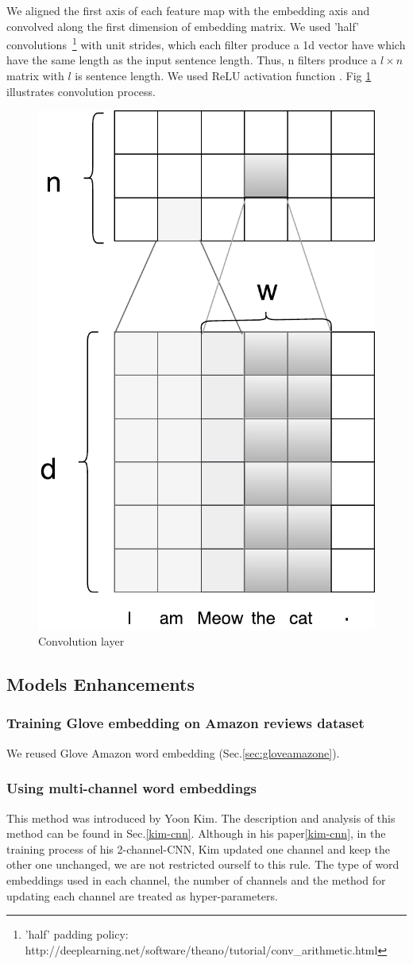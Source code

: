 We aligned the first axis of each feature map with the embedding axis and convolved along the first dimension of embedding matrix. 
We used 'half' convolutions~\footnote{'half' padding policy: http://deeplearning.net/software/theano/tutorial/conv\_arithmetic.html} with unit strides, which each filter produce a 1d vector have which have the same length as the input sentence length. 
Thus, n filters produce a $l \times n$ matrix with $l$ is sentence length. 
We used ReLU activation function \cite{hahnloser2000digital}. Fig \ref{fig:convlayer} illustrates convolution process. 



\begin{figure}[H]
    \centering
    \includegraphics[width=0.4\linewidth]{figure/convlayer}
    \caption[Convolution layer]{Convolution layer}
    \label{fig:convlayer}
\end{figure}

\subsection{Models Enhancements}\label{sec:model-enhan}
\subsubsection{Training Glove embedding on Amazon reviews dataset}\label{sec:reuse-glove-amazon}
We reused Glove Amazon word embedding (Sec.\ref{sec:gloveamazone}).

\subsubsection{Using multi-channel word embeddings}\label{sec:enhan-multi-channel}
This method was introduced by Yoon Kim\cite{KimCNN}.
The description and analysis of this method can be found in Sec.\ref{kim-cnn}.
Although in his paper\ref{kim-cnn}, in the training process of his 2-channel-CNN, Kim updated one channel and keep the other one unchanged, we are not restricted ourself to this rule. 
The type of word embeddings used in each channel, the number of channels and the method for updating each channel are treated as hyper-parameters.

